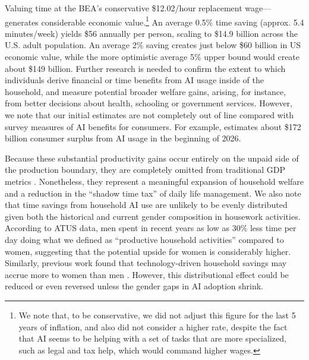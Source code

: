 \documentclass[11pt,a4paper]{article}
\begin{document}
Valuing time at the BEA’s conservative \$12.02/hour replacement wage—generates considerable economic value.\footnote{We note that, to be conservative, we did not adjust this figure for the last 5 years of inflation, and also did not consider a higher rate, despite the fact that AI seems to be helping with a set of tasks that are more specialized, such as legal and tax help, which would command higher wages.} An average 0.5\% time saving (approx. 5.4 minutes/week) yields \$56 annually per person, scaling to \$14.9 billion across the U.S. adult population. An average 2\% saving creates just below \$60 billion in US economic value, while the more optimistic average 5\% upper bound would create about \$149 billion. Further research is needed to confirm the extent to which individuals derive financial or time benefits from AI usage inside of the household, and measure potential broader welfare gains, arising, for instance, from better decisions about health, schooling or government services. However, we note that our initial estimates are not completely out of line compared with survey measures of AI benefits for consumers. For example, \citet{Nguyen2026} estimates about \$172 billion consumer surplus from AI usage in the beginning of 2026.

Because these substantial productivity gains occur entirely on the unpaid side of the production boundary, they are completely omitted from traditional GDP metrics \citep{10.1257/mac.20210319}. Nonetheless, they represent a meaningful expansion of household welfare and a reduction in the ``shadow time tax'' of daily life management. We also note that time savings from household AI use are unlikely to be evenly distributed given both the historical \citep{England2002} and current \citep{Milkie2025} gender composition in housework activities. According to ATUS data, men spent in recent years as low as 30\% less time per day doing what we defined as ``productive household activities'' compared to women, suggesting that the potential upside for women is considerably higher. Similarly, previous work found that technology-driven household savings may accrue more to women than men \citep{HERTOG2023122443}. However, this distributional effect could be reduced or even reversed unless the gender gaps in AI adoption \citep[e.g.,][]{cranney2026global, ALDASORO2024111814, educsci14121363} shrink.
\end{document}
